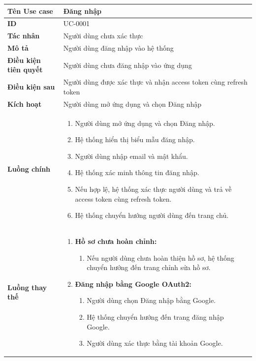 {
\small
\renewcommand{\arraystretch}{1.15}

\begin{tabularx}{\textwidth}{|>{\raggedright\arraybackslash}p{3.5cm}|>{\raggedright\arraybackslash}X|}
\hline
\textbf{Tên Use case} & Đăng nhập \\
\hline
\textbf{ID} & UC-0001 \\
\hline
\textbf{Tác nhân} & Người dùng chưa xác thực \\
\hline
\textbf{Mô tả} & Người dùng đăng nhập vào hệ thống \\
\hline
\textbf{Điều kiện tiên quyết} & Người dùng chưa đăng nhập vào ứng dụng \\
\hline
\textbf{Điều kiện sau} & Người dùng được xác thực và nhận access token cùng refresh token \\
\hline
\textbf{Kích hoạt} & Người dùng mở ứng dụng và chọn Đăng nhập \\
\hline
\textbf{Luồng chính} &
\begin{enumerate}
    \item Người dùng mở ứng dụng và chọn Đăng nhập.
    \item Hệ thống hiển thị biểu mẫu đăng nhập.
    \item Người dùng nhập email và mật khẩu.
    \item Hệ thống xác minh thông tin đăng nhập.
    \item Nếu hợp lệ, hệ thống xác thực người dùng và trả về access token cùng refresh token.
    \item Hệ thống chuyển hướng người dùng đến trang chủ.
\end{enumerate} \\
\hline
\textbf{Luồng thay thế} &
\begin{enumerate}
    \item \textbf{Hồ sơ chưa hoàn chỉnh:}
    \begin{enumerate}
        \item[6A.] Nếu người dùng chưa hoàn thiện hồ sơ, hệ thống chuyển hướng đến trang chỉnh sửa hồ sơ.
    \end{enumerate}
    \item \textbf{Đăng nhập bằng Google OAuth2:}
    \begin{enumerate}
        \item[3B.] Người dùng chọn Đăng nhập bằng Google.
        \item[4B.] Hệ thống chuyển hướng đến trang đăng nhập Google.
        \item[5B.] Người dùng xác thực bằng tài khoản Google.

\end{enumerate}
\end{enumerate}
\end{tabularx}}
